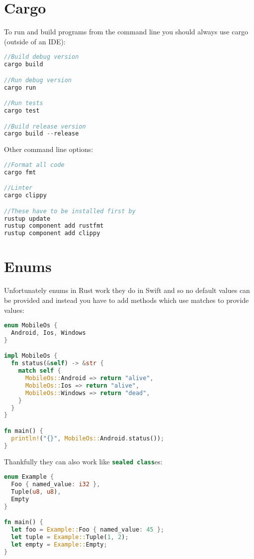 \documentclass[a4paper,11pt]{article}
\begin{document}
\newpage
\section{Cargo}

To run and build programs from the command line you should always use cargo (outside of an IDE):

\begin{lstlisting}[language=Rust,frame=single]
//Build debug version
cargo build

//Run debug version
cargo run

//Run tests
cargo test

//Build release version
cargo build --release
\end{lstlisting}

Other command line options:

\begin{lstlisting}[language=Rust,frame=single]
//Format all code
cargo fmt

//Linter
cargo clippy

//These have to be installed first by
rustup update
rustup component add rustfmt
rustup component add clippy
\end{lstlisting}

\newpage
\section{Enums}
Unfortunately enums in Rust work they do in Swift and so no default values can be provided and instead you have to add methods which use matches to provide values:

\begin{lstlisting}[language=Rust,frame=single]
enum MobileOs {
  Android, Ios, Windows
}

impl MobileOs {
  fn status(&self) -> &str {
    match self {
      MobileOs::Android => return "alive",
      MobileOs::Ios => return "alive",
      MobileOs::Windows => return "dead",
    }
  }
}

fn main() {
  println!("{}", MobileOs::Android.status());
}
\end{lstlisting}

Thankfully they can also work like \lstinline[language=Kotlin]{sealed class}es:

\begin{lstlisting}[language=Rust,frame=single]
enum Example {
  Foo { named_value: i32 },
  Tuple(u8, u8),
  Empty
}

fn main() {
  let foo = Example::Foo { named_value: 45 };
  let tuple = Example::Tuple(1, 2);
  let empty = Example::Empty;
}
\end{lstlisting}
\end{document}
